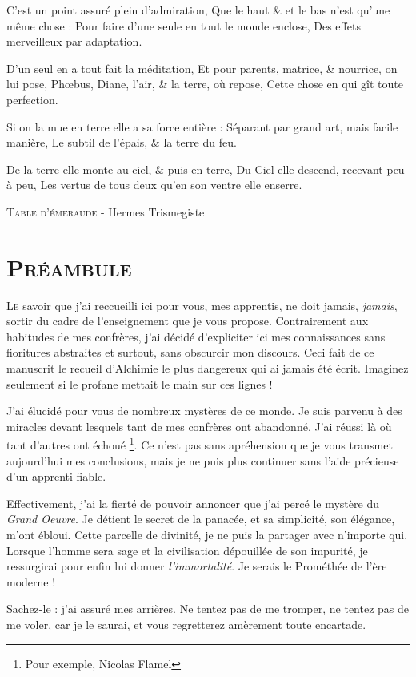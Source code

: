 C'est un point assuré plein d'admiration,
Que le haut \& et le bas n'est qu'une même chose :
Pour faire d'une seule en tout le monde enclose,
Des effets merveilleux par adaptation.

D'un seul en a tout fait la méditation,
Et pour parents, matrice, \& nourrice, on lui pose,
Phœbus, Diane, l'air, \& la terre, où repose,
Cette chose en qui gît toute perfection.

Si on la mue en terre elle a sa force entière :
Séparant par grand art, mais facile manière,
Le subtil de l'épais, \& la terre du feu.

De la terre elle monte au ciel, \& puis en terre,
Du Ciel elle descend, recevant peu à peu,
Les vertus de tous deux qu'en son ventre elle enserre.

\textsc{Table d'émeraude} - Hermes Trismegiste

\newpage

\section{\textsc{Préambule}}

\lettrine{L}{e} savoir que j'ai reccueilli ici pour vous, mes apprentis, ne doit jamais,
\emph{jamais}, sortir du cadre de l'enseignement que je vous propose.
Contrairement aux habitudes de mes confrères, j'ai décidé d'expliciter ici mes
connaissances sans fioritures abstraites et surtout, sans obscurcir mon
discours. Ceci fait de ce manuscrit le recueil d'Alchimie le plus dangereux qui
ai jamais été écrit. Imaginez seulement si le profane mettait le main sur ces
lignes !

J'ai élucidé pour vous de nombreux mystères de ce monde. Je suis parvenu à des
miracles devant lesquels tant de mes confrères ont abandonné. J'ai réussi là où
tant d'autres ont échoué \footnote{Pour exemple, Nicolas Flamel}. Ce n'est pas
sans apréhension que je vous transmet aujourd'hui mes conclusions, mais je ne puis
plus continuer sans l'aide précieuse d'un apprenti fiable.

Effectivement, j'ai la fierté de pouvoir annoncer que j'ai percé le mystère du
\emph{Grand Oeuvre}. Je détient le secret de la panacée, et sa simplicité, son
élégance, m'ont ébloui. Cette parcelle de divinité, je ne puis la partager avec
n'importe qui. Lorsque l'homme sera sage et la civilisation dépouillée de son
impurité, je ressurgirai pour enfin lui donner \emph{l'immortalité}. Je serais
le Prométhée de l'ère moderne !

Sachez-le : j'ai assuré mes arrières. Ne tentez pas de me tromper, ne tentez
pas de me voler, car je le saurai, et vous regretterez amèrement toute
encartade.

